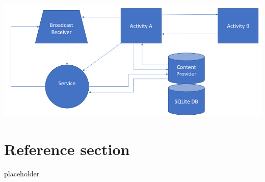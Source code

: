 \documentclass{article}
\begin{document}
\begin{center}
  \includegraphics[scale=0.5]{broadcast.png}
\end{center}


\pagebreak
\section*{Reference section} \label{sec:reference}
\begin{description}
	\item[placeholder] \hfill \\
\end{description}
\end{document}
